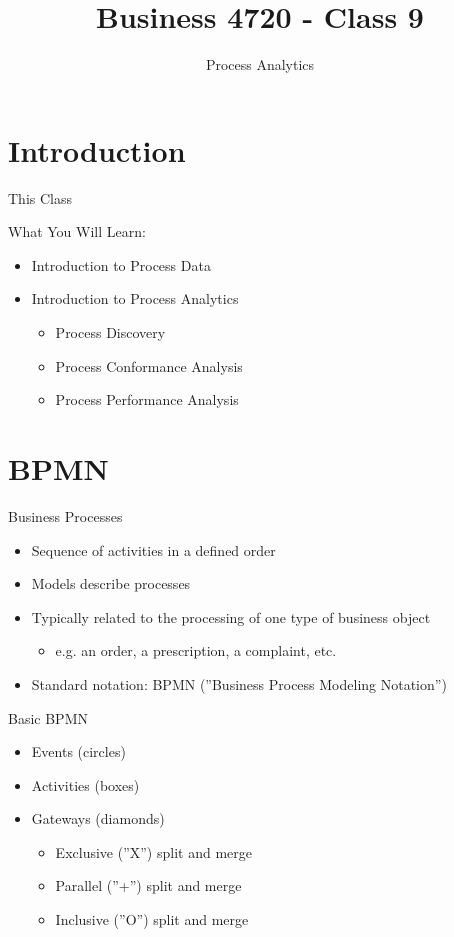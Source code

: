 \documentclass[ignorenonframetext,xcolor=x11names]{beamer}
\title{Business 4720 - Class 9}
\subtitle{Process Analytics}
\begin{document}
\begin{frame}[label=full]{}
  \titlepage
  \footnotesize
  
\end{frame}

\section{Introduction}

\begin{frame}[label=full]{This Class}

\begin{block}{What You Will Learn:}
\begin{itemize}
  \item Introduction to Process Data
  \item Introduction to Process Analytics
  \begin{itemize}
     \item Process Discovery
     \item Process Conformance Analysis
     \item Process Performance Analysis
  \end{itemize}
\end{itemize}
\end{block}
\end{frame}

\section{BPMN}

\begin{frame}[label=full]{Business Processes}
\begin{itemize}
   \item Sequence of activities in a defined order
   \item Models describe processes
   \item Typically related to the processing of one type of business object
   \begin{itemize}
      \item e.g. an order, a prescription, a complaint, etc.
   \end{itemize}
   \item Standard notation: BPMN (''Business Process Modeling Notation'')
\end{itemize}

\begin{block}{Basic BPMN}
\begin{itemize}
   \item Events (circles)
   \item Activities (boxes)
   \item Gateways (diamonds)
   \begin{itemize}
      \item Exclusive (''X'') split and merge
      \item Parallel (''+'') split and merge
      \item Inclusive (''O'') split and merge
   \end{itemize}
\end{itemize}
\end{block}
\end{frame}
\end{document}
